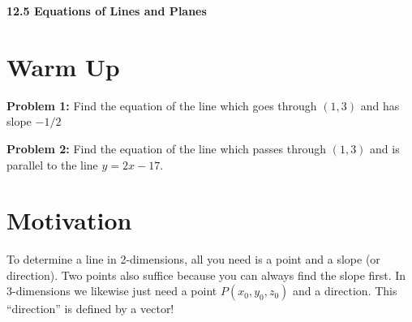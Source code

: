\documentclass[11pt]{article}
\newcommand{\vs}{\vspace*{.1in}}
\begin{document}
\begin{LARGE}\begin{center}\bf 12.5 Equations of Lines and Planes \end{center}
\end{LARGE}

\vs\vs



\section{Warm Up}
\textbf{Problem 1:} Find the equation of the line which goes through $(1,3)$ and has slope $-1/2$

\textbf{Problem 2:} Find the equation of the line which passes through $(1,3)$ and is parallel to the line $y=2x-17$.



\section{Motivation}
To determine a line in 2-dimensions, all you need is a point and a slope (or direction). Two points also suffice because you can always find the slope first. In 3-dimensions we likewise just need a point $P(x_0,y_0,z_0)$ and a direction. This ``direction'' is defined by a vector!
\end{document}
